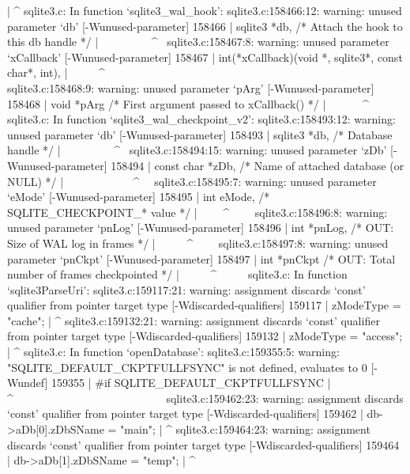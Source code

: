 {{{{{{{{{{{{{{{{{{{{       |                ^
sqlite3.c: In function ‘sqlite3_wal_hook’:
sqlite3.c:158466:12: warning: unused parameter ‘db’ [-Wunused-parameter]
158466 |   sqlite3 *db,                    /* Attach the hook to this db handle */
       |   ~~~~~~~~~^~
sqlite3.c:158467:8: warning: unused parameter ‘xCallback’ [-Wunused-parameter]
158467 |   int(*xCallback)(void *, sqlite3*, const char*, int),
       |   ~~~~~^~~~~~~~~~~~~~~~~~~~~~~~~~~~~~~~~~~~~~~~~~~~~~
sqlite3.c:158468:9: warning: unused parameter ‘pArg’ [-Wunused-parameter]
158468 |   void *pArg                      /* First argument passed to xCallback() */
       |   ~~~~~~^~~~
sqlite3.c: In function ‘sqlite3_wal_checkpoint_v2’:
sqlite3.c:158493:12: warning: unused parameter ‘db’ [-Wunused-parameter]
158493 |   sqlite3 *db,                    /* Database handle */
       |   ~~~~~~~~~^~
sqlite3.c:158494:15: warning: unused parameter ‘zDb’ [-Wunused-parameter]
158494 |   const char *zDb,                /* Name of attached database (or NULL) */
       |   ~~~~~~~~~~~~^~~
sqlite3.c:158495:7: warning: unused parameter ‘eMode’ [-Wunused-parameter]
158495 |   int eMode,                      /* SQLITE_CHECKPOINT_* value */
       |   ~~~~^~~~~
sqlite3.c:158496:8: warning: unused parameter ‘pnLog’ [-Wunused-parameter]
158496 |   int *pnLog,                     /* OUT: Size of WAL log in frames */
       |   ~~~~~^~~~~
sqlite3.c:158497:8: warning: unused parameter ‘pnCkpt’ [-Wunused-parameter]
158497 |   int *pnCkpt                     /* OUT: Total number of frames checkpointed */
       |   ~~~~~^~~~~~
sqlite3.c: In function ‘sqlite3ParseUri’:
sqlite3.c:159117:21: warning: assignment discards ‘const’ qualifier from pointer target type [-Wdiscarded-qualifiers]
159117 |           zModeType = "cache";
       |                     ^
sqlite3.c:159132:21: warning: assignment discards ‘const’ qualifier from pointer target type [-Wdiscarded-qualifiers]
159132 |           zModeType = "access";
       |                     ^
sqlite3.c: In function ‘openDatabase’:
sqlite3.c:159355:5: warning: "SQLITE_DEFAULT_CKPTFULLFSYNC" is not defined, evaluates to 0 [-Wundef]
159355 | #if SQLITE_DEFAULT_CKPTFULLFSYNC
       |     ^~~~~~~~~~~~~~~~~~~~~~~~~~~~
sqlite3.c:159462:23: warning: assignment discards ‘const’ qualifier from pointer target type [-Wdiscarded-qualifiers]
159462 |   db->aDb[0].zDbSName = "main";
       |                       ^
sqlite3.c:159464:23: warning: assignment discards ‘const’ qualifier from pointer target type [-Wdiscarded-qualifiers]
159464 |   db->aDb[1].zDbSName = "temp";
       |                       ^
}}}}}}}}}}}}}}}}}}}}
